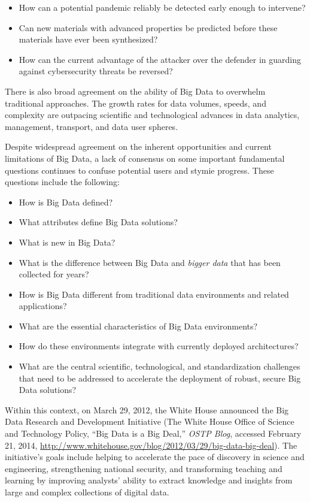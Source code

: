 \documentclass[9pt,]{article}
\providecommand{\tightlist}{%
  \setlength{\itemsep}{0pt}\setlength{\parskip}{0pt}}
\begin{document}
\begin{itemize}
\item
  How can a potential pandemic reliably be detected early enough to
  intervene?
\item
  Can new materials with advanced properties be predicted before these
  materials have ever been synthesized?
\item
  How can the current advantage of the attacker over the defender in
  guarding against cybersecurity threats be reversed?
\end{itemize}

There is also broad agreement on the ability of Big Data to overwhelm
traditional approaches. The growth rates for data volumes, speeds, and
complexity are outpacing scientific and technological advances in data
analytics, management, transport, and data user spheres.

Despite widespread agreement on the inherent opportunities and current
limitations of Big Data, a lack of consensus on some important
fundamental questions continues to confuse potential users and stymie
progress. These questions include the following:

\begin{itemize}
\tightlist
\item
  How is Big Data defined?
\item
  What attributes define Big Data solutions?
\item
  What is new in Big Data?
\item
  What is the difference between Big Data and \emph{bigger data} that
  has been collected for years?
\item
  How is Big Data different from traditional data environments and
  related applications?
\item
  What are the essential characteristics of Big Data environments?
\item
  How do these environments integrate with currently deployed
  architectures?
\item
  What are the central scientific, technological, and standardization
  challenges that need to be addressed to accelerate the deployment of
  robust, secure Big Data solutions?
\end{itemize}

Within this context, on March 29, 2012, the White House announced the
Big Data Research and Development Initiative (The White House Office of
Science and Technology Policy, ``Big Data is a Big Deal,'' \emph{OSTP
Blog}, accessed February 21, 2014,
\url{http://www.whitehouse.gov/blog/2012/03/29/big-data-big-deal}). The
initiative's goals include helping to accelerate the pace of discovery
in science and engineering, strengthening national security, and
transforming teaching and learning by improving analysts' ability to
extract knowledge and insights from large and complex collections of
digital data.
\end{document}
